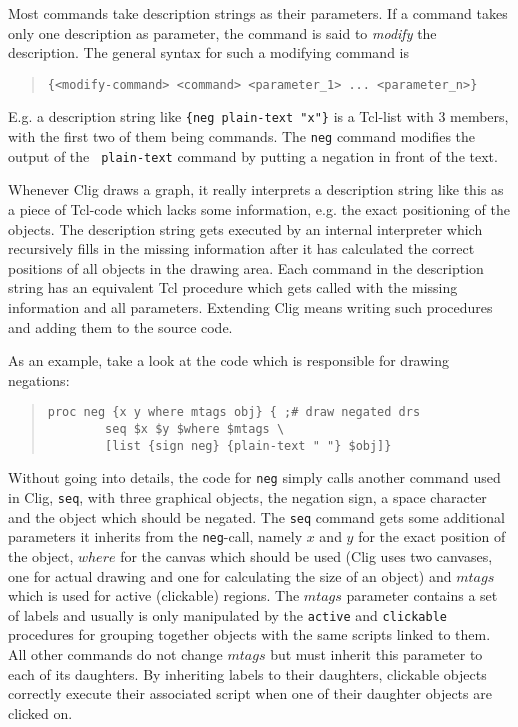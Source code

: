 Most commands take description strings as their parameters. If a
command takes only one description as parameter, the command is said
to {\it modify\/} the description. The general syntax for such a
modifying command is

\begin{quote}
\begin{verbatim}
{<modify-command> <command> <parameter_1> ... <parameter_n>}
\end{verbatim}
\end{quote}

E.g. a description string like \verb'{neg plain-text "x"}'  is a
Tcl-list with 3 members, with the first two of them being
commands. The {\tt neg} command modifies the output of the {\tt
plain-text} command by putting a negation in front of the text.

Whenever {\sc Clig} draws a graph, it really interprets a
description string like this as a piece of {\sc Tcl}-code which lacks
some information, e.g. the exact positioning of the objects. The
description string gets executed by an internal interpreter which
recursively fills in the missing information after it has calculated
the correct positions of all objects in the drawing area. Each command
in the description string has an equivalent {\sc Tcl} procedure which
gets called with the missing information and all parameters. Extending
{\sc Clig} means writing such procedures and adding them to the source
code. 

As an example, take a look at the code which is responsible for drawing
negations:

\begin{quote}
\begin{verbatim}
proc neg {x y where mtags obj} { ;# draw negated drs
        seq $x $y $where $mtags \
        [list {sign neg} {plain-text " "} $obj]}
\end{verbatim}
\end{quote}

Without going into details, the code for {\tt neg} simply calls another
command used in {\sc Clig}, {\tt seq}, with three graphical objects,
the negation sign, a space character and the object which should be
negated. The {\tt seq} command gets some additional parameters it
inherits from the {\tt neg}-call, namely $x$ and $y$ for the exact
position of the object, $where$ for the canvas which should be used
({\sc Clig} uses two canvases, one for actual drawing and one for
calculating the size of an object) and $mtags$ which is used for active
(clickable) regions. The $mtags$ parameter contains a set of labels and
usually is only manipulated by the {\tt active} and {\tt clickable}
procedures for grouping together objects with the same scripts linked
to them. All other commands do not change $mtags$ but must inherit this
parameter to each of its daughters. By inheriting labels to their
daughters, clickable objects correctly execute their associated script
when one of their daughter objects are clicked on.

